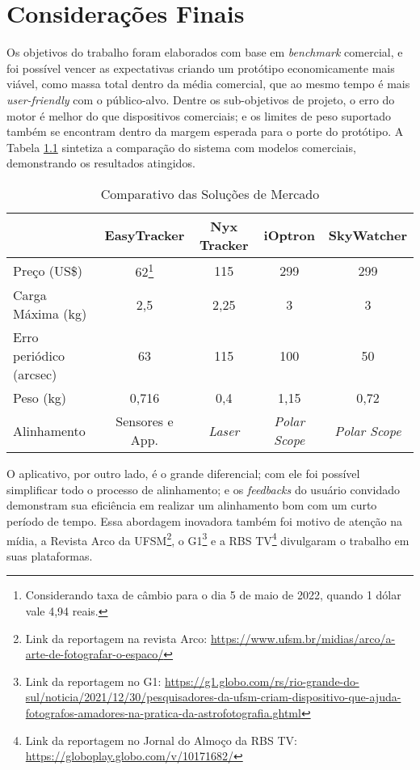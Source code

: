 \chapter{Considerações Finais}

Os objetivos do trabalho foram elaborados com base em \textit{benchmark} comercial, e foi possível vencer as expectativas criando um protótipo economicamente mais viável, como massa total dentro da média comercial, que ao mesmo tempo é mais \textit{user-friendly} com o público-alvo. Dentre os sub-objetivos de projeto, o erro do motor é melhor do que dispositivos comerciais; e os limites de peso suportado também se encontram dentro da margem esperada para o porte do protótipo. A Tabela \ref{tabela_benchmark_conclusao} sintetiza a comparação do sistema com modelos comerciais, demonstrando os resultados atingidos.


\begin{table}[htb]
	\caption{Comparativo das Soluções de Mercado}
	\begin{tabular}{l|cccc}
		& EasyTracker & Nyx Tracker & iOptron  & SkyWatcher \\ \hline
		Preço (US\$) & 62\footnote{Considerando taxa de câmbio para o dia 5 de maio de 2022, quando 1 dólar vale 4,94 reais. } & 115 & 299  & 299 \\\hline
		Carga Máxima (kg) & 2,5 & 2,25 & 3 & 3 \\\hline
		Erro periódico (arcsec) & 63 & 115 & 100 & 50 \\\hline
		Peso (kg) & 0,716 & 0,4 & 1,15 & 0,72 \\\hline
		Alinhamento & Sensores e App. & \textit{Laser} & \textit{Polar Scope} & \textit{Polar Scope} \\
	\end{tabular}
	\label{tabela_benchmark_conclusao}
\end{table}

O aplicativo, por outro lado, é o grande diferencial; com ele foi possível simplificar todo o processo de alinhamento; e os \textit{feedbacks} do usuário convidado demonstram sua eficiência em realizar um alinhamento bom com um curto período de tempo. Essa abordagem inovadora também foi motivo de atenção na mídia, a Revista Arco da UFSM\footnote{Link da reportagem na revista Arco: \url{https://www.ufsm.br/midias/arco/a-arte-de-fotografar-o-espaco/}}, o G1\footnote{Link da reportagem no G1: \url{https://g1.globo.com/rs/rio-grande-do-sul/noticia/2021/12/30/pesquisadores-da-ufsm-criam-dispositivo-que-ajuda-fotografos-amadores-na-pratica-da-astrofotografia.ghtml}} e a RBS TV\footnote{Link da reportagem no Jornal do Almoço da RBS TV: \url{https://globoplay.globo.com/v/10171682/}} divulgaram o trabalho em suas plataformas.


